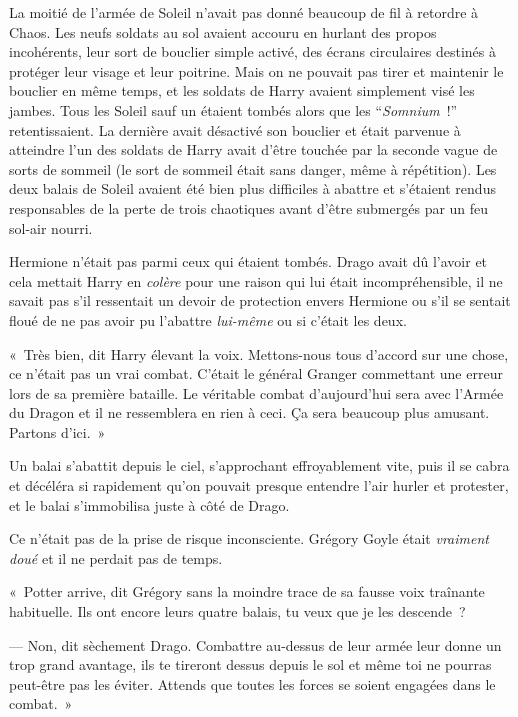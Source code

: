 La moitié de l'armée de Soleil n'avait pas donné beaucoup de fil à retordre à Chaos. Les neufs soldats au sol avaient accouru en hurlant des propos incohérents, leur sort de bouclier simple activé, des écrans circulaires destinés à protéger leur visage et leur poitrine. Mais on ne pouvait pas tirer et maintenir le bouclier en même temps, et les soldats de Harry avaient simplement visé les jambes. Tous les Soleil sauf un étaient tombés alors que les “\emph{Somnium}~!” retentissaient. La dernière avait désactivé son bouclier et était parvenue à atteindre l'un des soldats de Harry avait d'être touchée par la seconde vague de sorts de sommeil (le sort de sommeil était sans danger, même à répétition). Les deux balais de Soleil avaient été bien plus difficiles à abattre et s'étaient rendus responsables de la perte de trois chaotiques avant d'être submergés par un feu sol-air nourri.

Hermione n'était pas parmi ceux qui étaient tombés. Drago avait dû l'avoir et cela mettait Harry en \emph{colère} pour une raison qui lui était incompréhensible, il ne savait pas s'il ressentait un devoir de protection envers Hermione ou s'il se sentait floué de ne pas avoir pu l'abattre \emph{lui-même} ou si c'était les deux.

«~Très bien, dit Harry élevant la voix. Mettons-nous tous d'accord sur une chose, ce n'était pas un vrai combat. C'était le général Granger commettant une erreur lors de sa première bataille. Le véritable combat d'aujourd'hui sera avec l'Armée du Dragon et il ne ressemblera en rien à ceci. Ça sera beaucoup plus amusant. Partons d'ici.~»

\later

Un balai s'abattit depuis le ciel, s'approchant effroyablement vite, puis il se cabra et décéléra si rapidement qu'on pouvait presque entendre l'air hurler et protester, et le balai s'immobilisa juste à côté de Drago.

Ce n'était pas de la prise de risque inconsciente. Grégory Goyle était \emph{vraiment doué} et il ne perdait pas de temps.

«~Potter arrive, dit Grégory sans la moindre trace de sa fausse voix traînante habituelle. Ils ont encore leurs quatre balais, tu veux que je les descende~?

--- Non, dit sèchement Drago. Combattre au-dessus de leur armée leur donne un trop grand avantage, ils te tireront dessus depuis le sol et même toi ne pourras peut-être pas les éviter. Attends que toutes les forces se soient engagées dans le combat.~»

